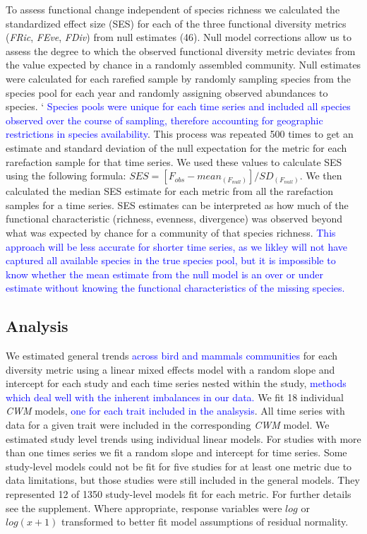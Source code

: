 \documentclass{article}
\begin{document}
To assess functional change independent of species richness we
calculated the standardized effect size (SES) for each of the three
functional diversity metrics (\emph{FRic}, \emph{FEve}, \emph{FDiv})
from null estimates (46). Null model corrections allow us to assess the
degree to which the observed functional diversity metric deviates from
the value expected by chance in a randomly assembled community. Null
estimates were calculated for each rarefied sample by randomly sampling
species from the species pool for each year and randomly assigning
observed abundances to species. `
\textcolor{blue}{Species pools were unique for each time series and included all species observed over the course of sampling, therefore accounting for geographic restrictions in species availability}.
This process was repeated 500 times to get an estimate and standard
deviation of the null expectation for the metric for each rarefaction
sample for that time series. We used these values to calculate SES using
the following formula:
\(SES = [F_{obs} - mean_{(F_{null})}]/SD_{(F_{null})}\). We then
calculated the median SES estimate for each metric from all the
rarefaction samples for a time series. SES estimates can be interpreted
as how much of the functional characteristic (richness, evenness,
divergence) was observed beyond what was expected by chance for a
community of that species richness.
\textcolor{blue}{This approach will be less accurate for shorter time series, as we likley will not have captured all available species in the true species pool, but it is impossible to know whether the mean estimate from the null model is an over or under estimate without knowing the functional characteristics of the missing species.}

\hypertarget{analysis}{%
\subsection{Analysis}\label{analysis}}

We estimated general trends
\textcolor{blue}{across bird and mammals communities} for each diversity
metric using a linear mixed effects model with a random slope and
intercept for each study and each time series nested within the study,
\textcolor{blue}{methods which deal well with the inherent imbalances in our data.}
We fit 18 individual \emph{CWM} models,
\textcolor{blue}{one for each trait included in the analsysis}. All time
series with data for a given trait were included in the corresponding
\emph{CWM} model. We estimated study level trends using individual
linear models. For studies with more than one times series we fit a
random slope and intercept for time series. Some study-level models
could not be fit for five studies for at least one metric due to data
limitations, but those studies were still included in the general
models. They represented 12 of 1350 study-level models fit for each
metric. For further details see the supplement. Where appropriate,
response variables were \(log\) or \(log(x+1)\) transformed to better
fit model assumptions of residual normality.
\end{document}

